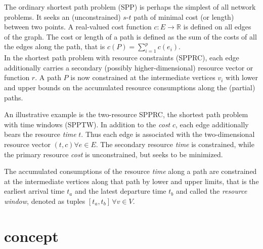The ordinary shortest path problem (SPP) is perhaps the simplest of all network problems. It seeks an (unconstrained) $s$-$t$ path of minimal cost (or length) between two points. A real-valued cost function $c : E \rightarrow \mathbb{R}$ is defined on all edges of the graph. The cost or length of a path is defined as the sum of the costs of all the edges along the path, that is $c(P)=\sum_{i=1}^p c(e_i)$. \\



In the shortest path problem with resource constraints (SPPRC), each edge additionally carries a secondary (possibly higher-dimensional) resource vector or function $r$. A path $P$ is now constrained at the intermediate vertices $v_i$ with lower and upper bounds on the accumulated resource consumptions along the (partial) paths.\\

\begin{example}[SPPTW]
An illustrative example is the two-resource SPPRC, the shortest path problem with time windows (SPPTW). In addition to the \textit{cost} $c$, each edge additionally bears the resource \textit{time} $t$. Thus each edge is associated with the two-dimensional resource vector $(t,c) \forall e \in E$. The secondary resource \textit{time} is constrained, while the primary resource \textit{cost} is unconstrained, but seeks to be minimized.

The accumulated consumptions of the resource \textit{time} along a path are constrained at the intermediate vertices along that path by lower and upper limits, that is the earliest arrival time $t_a$ and the latest departure time $t_b$ and called the \textit{resource window}, denoted as tuples $[t_a,t_b] \, \forall v \in V$.
\end{example}



\section{}



\section{concept}

